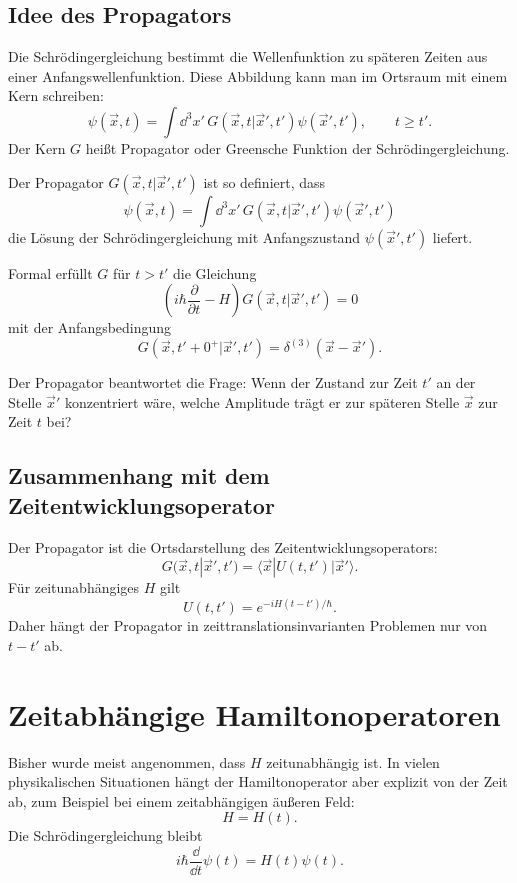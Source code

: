 \subsection{Idee des Propagators}

Die Schrödingergleichung bestimmt die Wellenfunktion zu späteren Zeiten aus einer Anfangswellenfunktion. Diese Abbildung kann man im Ortsraum mit einem Kern schreiben:
\[
    \psi(\vec{x},t)
    =\int\dd^3x'\,G(\vec{x},t|\vec{x}',t')\psi(\vec{x}',t'),
    \qquad t\geq t'.
\]
Der Kern $G$ heißt Propagator oder Greensche Funktion der Schrödingergleichung.

\begin{definitionbox}
Der Propagator $G(\vec{x},t|\vec{x}',t')$ ist so definiert, dass
\[
    \psi(\vec{x},t)
    =\int\dd^3x'\,G(\vec{x},t|\vec{x}',t')\psi(\vec{x}',t')
\]
die Lösung der Schrödingergleichung mit Anfangszustand $\psi(\vec{x}',t')$ liefert.
\end{definitionbox}

Formal erfüllt $G$ für $t>t'$ die Gleichung
\[
    \left(i\hbar\frac{\partial}{\partial t}-H\right)
    G(\vec{x},t|\vec{x}',t')=0
\]
mit der Anfangsbedingung
\[
    G(\vec{x},t'+0^+|\vec{x}',t')=\delta^{(3)}(\vec{x}-\vec{x}').
\]

\begin{conceptbox}
Der Propagator beantwortet die Frage: Wenn der Zustand zur Zeit $t'$ an der Stelle $\vec{x}'$ konzentriert wäre, welche Amplitude trägt er zur späteren Stelle $\vec{x}$ zur Zeit $t$ bei?
\end{conceptbox}

\subsection{Zusammenhang mit dem Zeitentwicklungsoperator}

Der Propagator ist die Ortsdarstellung des Zeitentwicklungsoperators:
\[
    G(\vec{x},t|\vec{x}',t')
    =\langle \vec{x}|U(t,t')|\vec{x}'\rangle.
\]
Für zeitunabhängiges $H$ gilt
\[
    U(t,t')=e^{-iH(t-t')/\hbar}.
\]
Daher hängt der Propagator in zeittranslationsinvarianten Problemen nur von $t-t'$ ab.

\section{Zeitabhängige Hamiltonoperatoren}

Bisher wurde meist angenommen, dass $H$ zeitunabhängig ist. In vielen physikalischen Situationen hängt der Hamiltonoperator aber explizit von der Zeit ab, zum Beispiel bei einem zeitabhängigen äußeren Feld:
\[
    H=H(t).
\]
Die Schrödingergleichung bleibt
\[
    i\hbar\frac{\dd}{\dd t}\psi(t)=H(t)\psi(t).
\]

